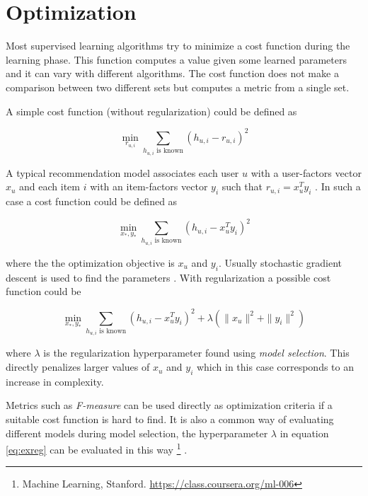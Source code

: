
\section{Optimization}\label{sec:background:opt}

Most supervised learning algorithms try to minimize a cost function during the learning phase. This function computes a value given some learned parameters and it can vary with different algorithms. The cost function does not make a comparison between two different sets but computes a metric from a single set.

A simple cost function (without regularization) could be defined as

\begin{equation}
    \min_{r_{u, i}} \sum_{h_{u,i} \text{ is known} } (h_{u, i} - r_{u, i})^2
\end{equation}

A typical recommendation model associates each user $u$ with a user-factors vector $x_u$ and each item $i$ with an item-factors vector $y_i$ such that $r_{u, i} = x_u^T y_i$
\citep{hu2008collaborative}. In such a case a cost function could be defined as

\begin{equation}
    \min_{x_*, y_*} \sum_{h_{u,i} \text{ is known} } (h_{u, i} - x_{u}^T y_i)^2
\end{equation}

where the the optimization objective is $x_u$ and $y_i$. Usually stochastic gradient descent is used to find the parameters \cite{hu2008collaborative}. With regularization a possible cost function could be

\begin{equation}\label{eq:exreg}
    \min_{x_*, y_*} \sum_{h_{u,i} \text{ is known} } (h_{u, i} - x_{u}^T y_i)^2 + \lambda(\|x_u\|^2 + \|y_i\|^2)
\end{equation}

where $\lambda$ is the regularization hyperparameter found using \textit{model selection}. This directly penalizes larger values of $x_u$ and $y_i$ which in this case corresponds to an increase in complexity.

Metrics such as \textit{F-measure} can be used directly as optimization criteria if a suitable cost function is hard to find. It is also a common way of evaluating different models during model selection, the hyperparameter $\lambda$ in equation \eqref{eq:exreg} can be evaluated in this way
\footnote{Machine Learning, Stanford. \url{https://class.coursera.org/ml-006}}
.

